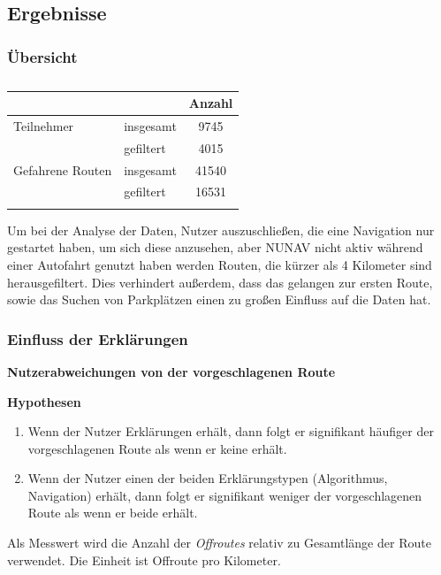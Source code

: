 \subsection{Ergebnisse}

\subsubsection*{Übersicht}

\begin{longtable}{|l|l|c|}
    \hline
                        &           & \textbf{Anzahl} \\ \hline
    Teilnehmer          & insgesamt & 9745 \\
                        & gefiltert & 4015 \\ \hline
    Gefahrene Routen    & insgesamt & 41540 \\
                        & gefiltert & 16531 \\ \hline
\caption{}
\label{tab:study_user_overview}
\end{longtable}

Um bei der Analyse der Daten, Nutzer auszuschließen, die eine Navigation nur gestartet haben, um sich diese anzusehen, aber NUNAV nicht aktiv während einer Autofahrt genutzt haben werden Routen, die kürzer als 4 Kilometer sind herausgefiltert. Dies verhindert außerdem, dass das gelangen zur ersten Route, sowie das Suchen von Parkplätzen einen zu großen Einfluss auf die Daten hat.

\subsubsection{Einfluss der Erklärungen}

\textbf{Nutzerabweichungen von der vorgeschlagenen Route}

\textbf{Hypothesen}

\begin{enumerate}
    \item Wenn der Nutzer Erklärungen erhält, dann folgt er signifikant häufiger der vorgeschlagenen Route als wenn er keine erhält.
    \item Wenn der Nutzer einen der beiden Erklärungstypen (Algorithmus, Navigation) erhält, dann folgt er signifikant weniger der vorgeschlagenen Route als wenn er beide erhält.
\end{enumerate}

 Als Messwert wird die Anzahl der \textit{Offroutes} relativ zu Gesamtlänge der Route verwendet. Die Einheit ist Offroute pro Kilometer.

